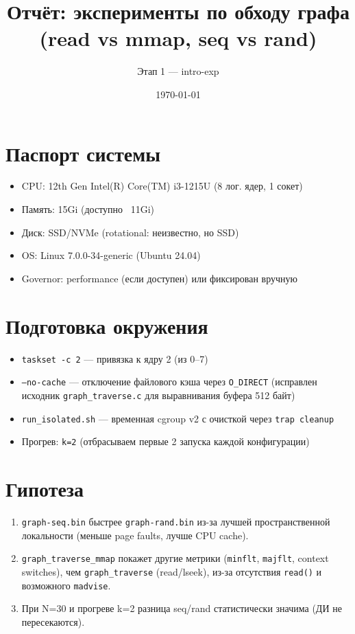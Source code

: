 \documentclass[12pt,a4paper]{article}
\title{Отчёт: эксперименты по обходу графа (read vs mmap, seq vs rand)}
\author{Этап 1 — intro-exp}
\date{\today}
\begin{document}
\maketitle

\section{Паспорт системы}
\begin{itemize}
    \item CPU: 12th Gen Intel(R) Core(TM) i3-1215U (8 лог. ядер, 1 сокет)
    \item Память: 15Gi (доступно ~11Gi)
    \item Диск: SSD/NVMe (rotational: неизвестно, но SSD)
    \item OS: Linux 7.0.0-34-generic (Ubuntu 24.04)
    \item Governor: performance (если доступен) или фиксирован вручную
\end{itemize}

\section{Подготовка окружения}
\begin{itemize}
    \item \texttt{taskset -c 2} — привязка к ядру 2 (из 0--7)
    \item \texttt{--no-cache} — отключение файлового кэша через \texttt{O\_DIRECT} (исправлен исходник \texttt{graph\_traverse.c} для выравнивания буфера 512 байт)
    \item \texttt{run\_isolated.sh} — временная cgroup v2 с очисткой через \texttt{trap cleanup}
    \item Прогрев: \texttt{k=2} (отбрасываем первые 2 запуска каждой конфигурации)
\end{itemize}

\section{Гипотеза}
\begin{enumerate}
    \item \texttt{graph-seq.bin} быстрее \texttt{graph-rand.bin} из-за лучшей пространственной локальности (меньше page faults, лучше CPU cache).
    \item \texttt{graph\_traverse\_mmap} покажет другие метрики (\texttt{minflt}, \texttt{majflt}, context switches), чем \texttt{graph\_traverse} (read/lseek), из-за отсутствия \texttt{read()} и возможного \texttt{madvise}.
    \item При N=30 и прогреве k=2 разница seq/rand статистически значима (ДИ не пересекаются).
\end{enumerate}
\end{document}
